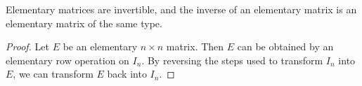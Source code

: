\begin{theorem}
    Elementary matrices are invertible, and the inverse of an elementary matrix is an elementary matrix of the same type.
\end{theorem}
\begin{proof}
Let \( E  \) be an elementary \( n \times n  \) matrix. Then \( E  \) can be obtained by an elementary row operation on \( {I}_{n} \). By reversing the steps used to transform \( {I}_{n}  \) into \( E  \), we can transform \( E  \) back into \( {I}_{n} \).
\end{proof}
